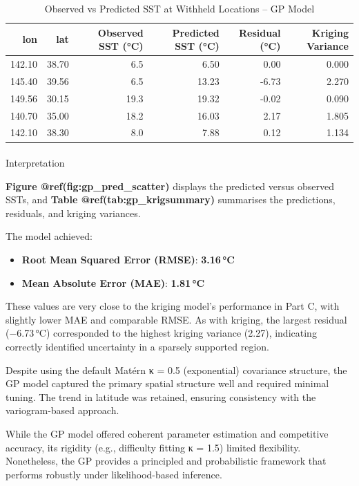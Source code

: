 \documentclass[
  11pt,
]{article}
\makeatletter
\let\oldparagraph\paragraph
\renewcommand{\paragraph}{
    \@ifstar
      \xxxParagraphStar
      \xxxParagraphNoStar
  }
\newcommand{\xxxParagraphStar}[1]{\oldparagraph*{#1}\mbox{}}
\newcommand{\xxxParagraphNoStar}[1]{\oldparagraph{#1}\mbox{}}
\makeatother
\begin{document}
\begin{table}

\caption{Observed vs Predicted SST at Withheld Locations -- GP Model}
\centering
\begin{tabular}[t]{rrrrrr}
\toprule
lon & lat & Observed SST (°C) & Predicted SST (°C) & Residual (°C) & Kriging Variance\\
\midrule
142.10 & 38.70 & 6.5 & 6.50 & 0.00 & 0.000\\
145.40 & 39.56 & 6.5 & 13.23 & -6.73 & 2.270\\
149.56 & 30.15 & 19.3 & 19.32 & -0.02 & 0.090\\
140.70 & 35.00 & 18.2 & 16.03 & 2.17 & 1.805\\
142.10 & 38.30 & 8.0 & 7.88 & 0.12 & 1.134\\
\bottomrule
\end{tabular}
\end{table}

\paragraph{Interpretation}\label{interpretation}

\textbf{Figure @ref(fig:gp\_pred\_scatter)} displays the predicted
versus observed SSTs, and \textbf{Table @ref(tab:gp\_krigsummary)}
summarises the predictions, residuals, and kriging variances.

The model achieved:

\begin{itemize}
\item
  \textbf{Root Mean Squared Error (RMSE)}: \textbf{3.16\,°C}
\item
  \textbf{Mean Absolute Error (MAE)}: \textbf{1.81\,°C}
\end{itemize}

These values are very close to the kriging model's performance in Part
C, with slightly lower MAE and comparable RMSE. As with kriging, the
largest residual (−6.73\,°C) corresponded to the highest kriging
variance (2.27), indicating correctly identified uncertainty in a
sparsely supported region.

Despite using the default Matérn κ = 0.5 (exponential) covariance
structure, the GP model captured the primary spatial structure well and
required minimal tuning. The trend in latitude was retained, ensuring
consistency with the variogram-based approach.

While the GP model offered coherent parameter estimation and competitive
accuracy, its rigidity (e.g., difficulty fitting κ = 1.5) limited
flexibility. Nonetheless, the GP provides a principled and probabilistic
framework that performs robustly under likelihood-based inference.
\end{document}
